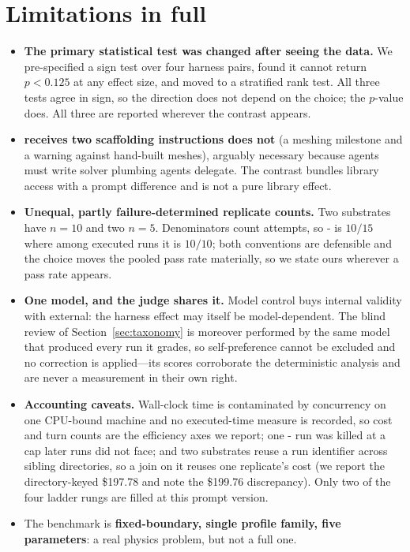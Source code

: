 \section{Limitations in full}
\label{app:limitations}

\begin{itemize}
\item \textbf{The primary statistical test was changed after seeing the data.}
  We pre-specified a sign test over four harness pairs, found it cannot return
  $p < 0.125$ at any effect size, and moved to a stratified rank test. All three
  tests agree in sign, so the direction does not depend on the choice; the
  $p$-value does. All three are reported wherever the contrast appears.
\item \textbf{\Lthree{} receives two scaffolding instructions \Ltwo{} does not}
  (a meshing milestone and a warning against hand-built meshes), arguably
  necessary because \Lthree{} agents must write solver plumbing \Ltwo{} agents
  delegate. The contrast bundles library access with a prompt difference and is
  not a pure library effect.
\item \textbf{Unequal, partly failure-determined replicate counts.} Two
  substrates have $n=10$ and two $n=5$. Denominators count attempts, so
  \Ltwo{}- is $10/15$ where among executed runs it is $10/10$; both
  conventions are defensible and the choice moves the pooled \Ltwo{} pass rate
  materially, so we state ours wherever a pass rate appears.
\item \textbf{One model, and the judge shares it.} Model control buys internal
  validity with external: the harness effect may itself be model-dependent. The
  blind review of Section~\ref{sec:taxonomy} is moreover performed by the same
  model that produced every run it grades, so self-preference cannot be excluded
  and no correction is applied---its scores corroborate the deterministic
  analysis and are never a measurement in their own right.
\item \textbf{Accounting caveats.} Wall-clock time is contaminated by
  concurrency on one CPU-bound machine and no executed-time measure is recorded,
  so cost and turn counts are the efficiency axes we report; one
  \Lthree{}- run was killed at a cap later runs did not face; and two
  substrates reuse a run identifier across sibling directories, so a join on it
  reuses one replicate's cost (we report the directory-keyed \$197.78 and note
  the \$199.76 discrepancy). Only two of the four ladder rungs are filled at
  this prompt version.
\item The benchmark is \textbf{fixed-boundary, single profile family, five
  parameters}: a real physics problem, but not a full one.
\end{itemize}

